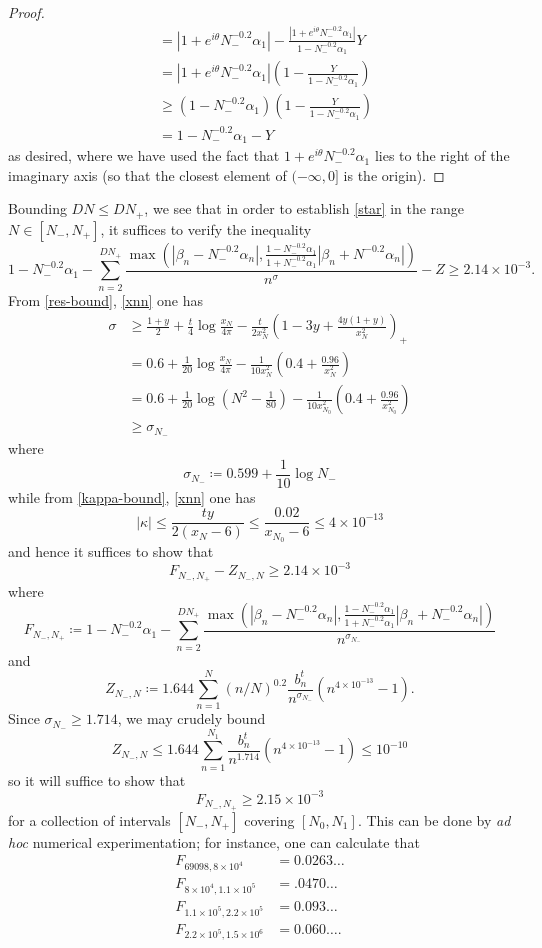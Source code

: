 \begin{proof}
\begin{align*}
&= |1 + e^{i\theta} N_-^{-0.2} \alpha_1| - \frac{|1+e^{i\theta} N_-^{-0.2} \alpha_1|}{1-N_-^{-0.2} \alpha_1} Y  \\
&= |1 + e^{i\theta} N_-^{-0.2} \alpha_1| \left(1 - \frac{Y}{1-N_-^{-0.2} \alpha_1} \right) \\
&\geq (1-N_-^{-0.2} \alpha_1) \left(1 - \frac{Y}{1-N_-^{-0.2} \alpha_1} \right) \\
&= 1 - N_-^{-0.2} \alpha_1 - Y
\end{align*}
as desired, where we have used the fact that $1+e^{i\theta} N_-^{-0.2} \alpha_1$ lies to the right of the imaginary axis (so that the closest element of $(-\infty,0]$ is the origin).
\end{proof}

Bounding $DN \leq DN_+$, we see that in order to establish \eqref{star} in the range $N \in [N_-, N_+]$, it suffices to verify the inequality
$$ 1 - N_-^{-0.2} \alpha_1 - \sum_{n=2}^{DN_+} \frac{\max(|\beta_n-N_-^{-0.2} \alpha_n|, \frac{1-N_-^{-0.2} \alpha_1}{1+N_-^{-0.2} \alpha_1} |\beta_n+N^{-0.2} \alpha_n|)}{n^{\sigma}} - Z
\geq 2.14 \times 10^{-3}.$$
From \eqref{res-bound}, \eqref{xnn} one has 
\begin{align*}
 \sigma &\geq \frac{1+y}{2} +\frac{t}{4} \log \frac{x_N}{4\pi} - \frac{t}{2x_N^2} \left(1-3y+\frac{4y(1+y)}{x_N^2}\right)_+ \\
&= 0.6 + \frac{1}{20} \log \frac{x_N}{4\pi} - \frac{1}{10 x_N^2} \left( 0.4 + \frac{0.96}{x_N^2} \right) \\
&= 0.6 + \frac{1}{20} \log (N^2 - \frac{1}{80}) - \frac{1}{10 x_{N_0}^2} \left( 0.4 + \frac{0.96}{x_{N_0}^2} \right) \\
&\geq \sigma_{N_-}
\end{align*}
where
$$ \sigma_{N_-} \coloneqq 0.599 + \frac{1}{10} \log N_- $$
while from \eqref{kappa-bound}, \eqref{xnn} one has
$$ |\kappa| \leq \frac{ty}{2(x_N-6)} \leq \frac{0.02}{x_{N_0}-6} \leq 4 \times 10^{-13}$$
and hence it suffices to show that
$$ F_{N_-,N_+} - Z_{N_-,N} \geq 2.14 \times 10^{-3}$$
where
$$ F_{N_-,N_+} \coloneqq 1 - N_-^{-0.2} \alpha_1 - \sum_{n=2}^{DN_+} \frac{\max(|\beta_n-N_-^{-0.2} \alpha_n|, \frac{1-N_-^{-0.2} \alpha_1}{1+N_-^{-0.2} \alpha_1} |\beta_n+N_-^{-0.2} \alpha_n|)}{n^{\sigma_{N_-}}}$$
and
$$ Z_{N_-,N} \coloneqq 1.644 \sum_{n=1}^N (n/N)^{0.2} \frac{b_n^t}{n^{\sigma_{N_-}}} (n^{4 \times 10^{-13}}-1).$$
Since $\sigma_{N_-} \geq 1.714$, we may crudely bound
$$ Z_{N_-,N} \leq 1.644 \sum_{n=1}^{N_1} \frac{b_n^t}{n^{1.714}} (n^{4 \times 10^{-13}}-1) \leq 10^{-10}$$
so it will suffice to show that
$$ F_{N_-,N_+} \geq 2.15 \times 10^{-3}$$
for a collection of intervals $[N_-,N_+]$ covering $[N_0, N_1]$.  This can be done by \emph{ad hoc} numerical experimentation; for instance, one can calculate that
\begin{align*}
F_{69098, 8 \times 10^4} &= 0.0263\dots \\
F_{8 \times 10^4, 1.1 \times 10^5} &= .0470\dots \\
F_{1.1 \times 10^5, 2.2 \times 10^5} &= 0.093\dots \\
F_{2.2 \times 10^5, 1.5 \times 10^6} &= 0.060\dots .
\end{align*}
